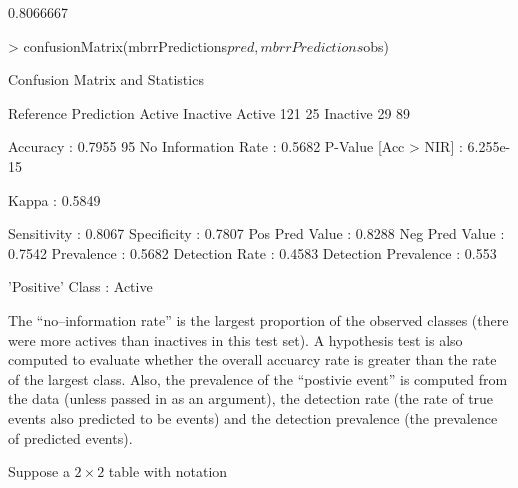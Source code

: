 \documentclass[12pt]{article}
\begin{document}
\begin{small}
\begin{Schunk}
\begin{Soutput}
[1] 0.8066667
\end{Soutput}
\begin{Sinput}
> confusionMatrix(mbrrPredictions$pred, mbrrPredictions$obs)
\end{Sinput}
\begin{Soutput}
Confusion Matrix and Statistics

          Reference
Prediction Active Inactive
  Active      121       25
  Inactive     29       89
                                        
             Accuracy : 0.7955          
               95% CI : (0.7417, 0.8424)
  No Information Rate : 0.5682          
  P-Value [Acc > NIR] : 6.255e-15       
                                        
                Kappa : 0.5849          
                                        
          Sensitivity : 0.8067          
          Specificity : 0.7807          
       Pos Pred Value : 0.8288          
       Neg Pred Value : 0.7542          
           Prevalence : 0.5682          
       Detection Rate : 0.4583          
 Detection Prevalence : 0.553           
                                        
     'Positive' Class : Active          
\end{Soutput}
\end{Schunk}
\end{small}

The ``no--information rate'' is the largest proportion of the observed classes (there were more actives than inactives in this test set). A hypothesis test is also computed to evaluate whether the overall accuarcy rate is greater than the rate of the largest class. Also, the prevalence of the ``postivie event'' is computed from the data (unless passed in as an argument), the detection rate (the rate of true events also 
predicted to be events) and the detection prevalence (the prevalence of predicted events).

Suppose a $2 $ table with notation
\end{document}
